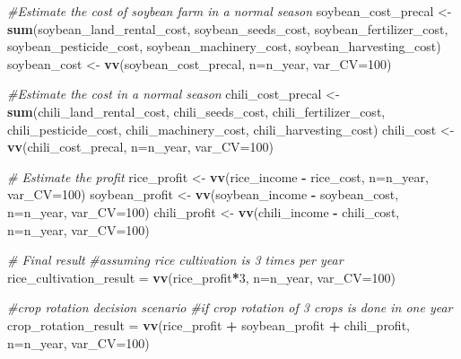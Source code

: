 \documentclass[
]{article}
\newenvironment{Shaded}{\begin{snugshade}}{\end{snugshade}}
\newcommand{\AttributeTok}[1]{\textcolor[rgb]{0.13,0.29,0.53}{#1}}
\newcommand{\CommentTok}[1]{\textcolor[rgb]{0.56,0.35,0.01}{\textit{#1}}}
\newcommand{\DecValTok}[1]{\textcolor[rgb]{0.00,0.00,0.81}{#1}}
\newcommand{\FunctionTok}[1]{\textcolor[rgb]{0.13,0.29,0.53}{\textbf{#1}}}
\newcommand{\NormalTok}[1]{#1}
\newcommand{\OtherTok}[1]{\textcolor[rgb]{0.56,0.35,0.01}{#1}}
\newcommand{\SpecialCharTok}[1]{\textcolor[rgb]{0.81,0.36,0.00}{\textbf{#1}}}
\begin{document}
\begin{Shaded}
\begin{Highlighting}[]
  
  \CommentTok{\#Estimate the cost of soybean farm in a normal season}
\NormalTok{  soybean\_cost\_precal }\OtherTok{\textless{}{-}} \FunctionTok{sum}\NormalTok{(soybean\_land\_rental\_cost, soybean\_seeds\_cost, soybean\_fertilizer\_cost,}
\NormalTok{                             soybean\_pesticide\_cost, soybean\_machinery\_cost, soybean\_harvesting\_cost)}
\NormalTok{  soybean\_cost }\OtherTok{\textless{}{-}} \FunctionTok{vv}\NormalTok{(soybean\_cost\_precal, }\AttributeTok{n=}\NormalTok{n\_year, }\AttributeTok{var\_CV=}\DecValTok{100}\NormalTok{)}
  
  
  \CommentTok{\#Estimate the cost in a normal season}
\NormalTok{  chili\_cost\_precal }\OtherTok{\textless{}{-}} \FunctionTok{sum}\NormalTok{(chili\_land\_rental\_cost, chili\_seeds\_cost, chili\_fertilizer\_cost,}
\NormalTok{                           chili\_pesticide\_cost, chili\_machinery\_cost, chili\_harvesting\_cost)}
\NormalTok{  chili\_cost }\OtherTok{\textless{}{-}} \FunctionTok{vv}\NormalTok{(chili\_cost\_precal, }\AttributeTok{n=}\NormalTok{n\_year, }\AttributeTok{var\_CV=}\DecValTok{100}\NormalTok{)}
  
  
  \CommentTok{\# Estimate the profit}
\NormalTok{  rice\_profit }\OtherTok{\textless{}{-}} \FunctionTok{vv}\NormalTok{(rice\_income }\SpecialCharTok{{-}}\NormalTok{ rice\_cost, }\AttributeTok{n=}\NormalTok{n\_year, }\AttributeTok{var\_CV=}\DecValTok{100}\NormalTok{)}
\NormalTok{  soybean\_profit }\OtherTok{\textless{}{-}} \FunctionTok{vv}\NormalTok{(soybean\_income }\SpecialCharTok{{-}}\NormalTok{ soybean\_cost, }\AttributeTok{n=}\NormalTok{n\_year, }\AttributeTok{var\_CV=}\DecValTok{100}\NormalTok{)}
\NormalTok{  chili\_profit }\OtherTok{\textless{}{-}} \FunctionTok{vv}\NormalTok{(chili\_income }\SpecialCharTok{{-}}\NormalTok{ chili\_cost, }\AttributeTok{n=}\NormalTok{n\_year, }\AttributeTok{var\_CV=}\DecValTok{100}\NormalTok{)}
  
  
  \CommentTok{\# Final result}
  \CommentTok{\#assuming rice cultivation is 3 times per year  }
\NormalTok{  rice\_cultivation\_result }\OtherTok{=} \FunctionTok{vv}\NormalTok{(rice\_profit}\SpecialCharTok{*}\DecValTok{3}\NormalTok{, }\AttributeTok{n=}\NormalTok{n\_year, }\AttributeTok{var\_CV=}\DecValTok{100}\NormalTok{)}
  
  \CommentTok{\#crop rotation decision scenario}
  \CommentTok{\#if crop rotation of 3 crops is done in one year}
\NormalTok{  crop\_rotation\_result }\OtherTok{=} \FunctionTok{vv}\NormalTok{(rice\_profit }\SpecialCharTok{+}\NormalTok{ soybean\_profit }\SpecialCharTok{+}\NormalTok{ chili\_profit, }\AttributeTok{n=}\NormalTok{n\_year, }\AttributeTok{var\_CV=}\DecValTok{100}\NormalTok{)}
  

\end{Highlighting}
\end{Shaded}
\end{document}

